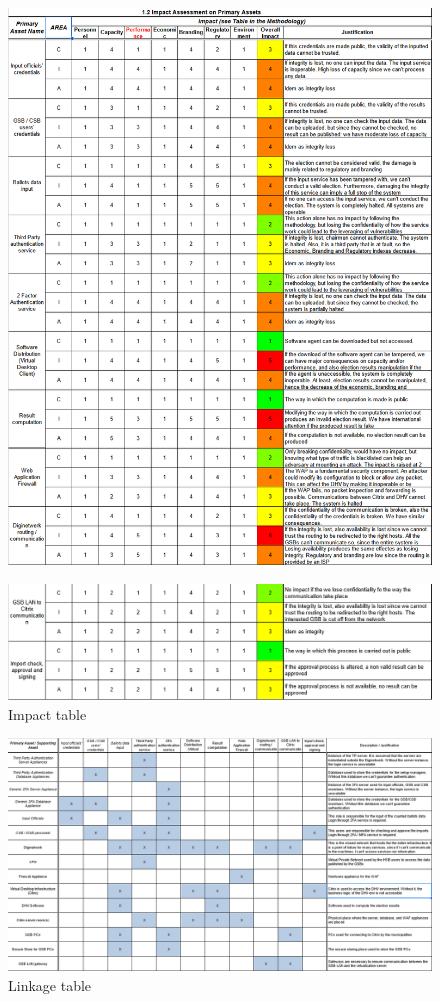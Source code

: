 \begin{figure}[h!]
    \centering
    \includegraphics[keepaspectratio,width=1\textwidth]{03-risk-analysis/002-SAIV/img/cut1Impa.png}
    \label{fig:impact1}
\end{figure}

\begin{figure}[h!]
    \centering
    \includegraphics[keepaspectratio,width=1\textwidth]{03-risk-analysis/002-SAIV/img/cut2Impa.png}
    \caption{Impact table}
    \label{fig:impact2}
\end{figure}

\begin{figure}[h!]
    \centering
    \includegraphics[keepaspectratio,width=1\textwidth]{03-risk-analysis/002-SAIV/img/linkage.png}
    \caption{Linkage table}
    \label{fig:linkage}
\end{figure}

\newpage
